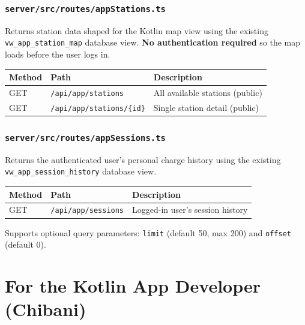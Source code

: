 \documentclass[12pt,a4paper]{report}
\newcommand{\file}[1]{\texttt{\small #1}}
\begin{document}
\subsection{\file{server/src/routes/appStations.ts}}

Returns station data shaped for the Kotlin map view using the existing
\texttt{vw\_app\_station\_map} database view. \textbf{No authentication required}
so the map loads before the user logs in.

\begin{center}
\begin{tabularx}{0.9\linewidth}{>{\ttfamily\small}l l X}
  \toprule
  \rowcolor{tablehead}\color{white}\textbf{Method} & \color{white}\textbf{Path} & \color{white}\textbf{Description} \\
  \midrule
  GET & \texttt{/api/app/stations}      & All available stations (public) \\
  \rowcolor{rowalt}
  GET & \texttt{/api/app/stations/\{id\}} & Single station detail (public) \\
  \bottomrule
\end{tabularx}
\end{center}

\subsection{\file{server/src/routes/appSessions.ts}}

Returns the authenticated user's personal charge history using the existing
\texttt{vw\_app\_session\_history} database view.

\begin{center}
\begin{tabularx}{0.9\linewidth}{>{\ttfamily\small}l l X}
  \toprule
  \rowcolor{tablehead}\color{white}\textbf{Method} & \color{white}\textbf{Path} & \color{white}\textbf{Description} \\
  \midrule
  GET & \texttt{/api/app/sessions} & Logged-in user's session history \\
  \bottomrule
\end{tabularx}
\end{center}

Supports optional query parameters: \texttt{limit} (default 50, max 200) and \texttt{offset} (default 0).

\chapter{For the Kotlin App Developer (Chibani)}
\end{document}
